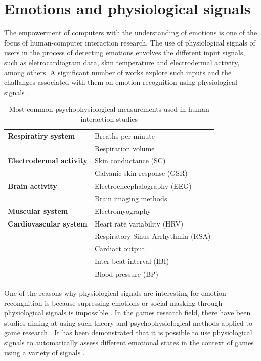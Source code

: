 \chapter{Emotions and physiological signals}
\label{ch:literature-physiological}

The empowerment of computers with the understanding of emotions is one of the focus of human-computer interaction research. The use of physiological signals of users in the process of detecting emotions envolves the different input signals, such as eletrocardiogram data, skin temperature and electrodermal activity, among others. A significant number of works explore such inputs and the challanges associated with them on emotion recognition using physiological signals \parencite{jerritta2011physiological}.


\begin{table}[h]
\caption{Most common psychophysiological measurements used in human interaction studies \parencite{jerritta2011physiological}}
\label{table:physiological-signals}
\begin{tabular}{L{.4\linewidth}L{.5\linewidth}}%
\toprule%
\textbf{Respiratiry system} & Breaths per minute\\
 & Respiration volume \\
\midrule
 \textbf{Electrodermal activity} & Skin conductance (SC) \\
 & Galvanic skin response (GSR) \\
\midrule
\textbf{Brain activity} & Electroencephalography (EEG) \\
& Brain imaging methods \\
\midrule
\textbf{Muscular system} & Electromyography \\
\midrule
\textbf{Cardiovascular system} & Heart rate variability (HRV) \\
& Respiratory Sinus Arrhythmia (RSA)  \\
& Cardiact output  \\
& Inter beat interval (IBI) \\
& Blood pressure (BP)  \\
\bottomrule%
\end{tabular}%
\end{table}

One of the reasons why physiological signals are interesting for emotion recongnition is because supressing emotions or social masking through physiological signals is impossible \parencite{kim2004emotion}. In the games research field, there have been studies aiming at using such theory and psychophysiological methods applied to game research \parencite{kivikangas2011review}. It has been demonstrated that it is possible to use physiological signals to automatically assess different emotional states in the context of games using a variety of signals \parencite{bousefsaf2013remote,yun2009game,rani2006empirical,tijs2008dynamic}.

